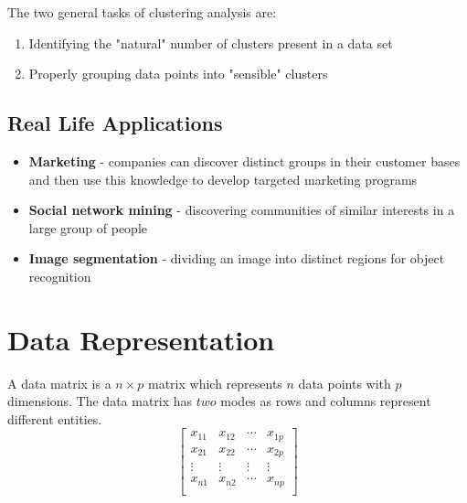 \documentclass[11pt,fleqn]{book} %
\begin{document}
\noindent
The two general tasks of clustering analysis are:
\begin{enumerate}
	\item Identifying the "natural" number of clusters present in a data set
	\item Properly grouping data points into "sensible" clusters
\end{enumerate}

\subsection*{Real Life Applications}
\begin{itemize}
	\item \textbf{Marketing} - companies can discover distinct groups in their customer bases and then use this knowledge to develop targeted marketing programs
	\item \textbf{Social network mining} - discovering communities of similar interests in a large group of people
	\item \textbf{Image segmentation} - dividing an image into distinct regions for object recognition
\end{itemize}

\section{Data Representation}
\begin{multicols}{2}
\noindent
A data matrix is a $n \times p$ matrix which represents $n$ data points with $p$ dimensions. The data matrix has $two$ modes as rows and columns represent different entities.
\columnbreak
\begin{equation*}
	\begin{bmatrix}
		x_{11} & x_{12} & \cdots & x_{1p} \\
		x_{21} & x_{22} & \cdots & x_{2p} \\
		\vdots & \vdots & \vdots & \vdots \\
		x_{n1} & x_{n2} & \cdots & x_{np} \\
	\end{bmatrix}
\end{equation*}
\end{multicols}
\end{document}
